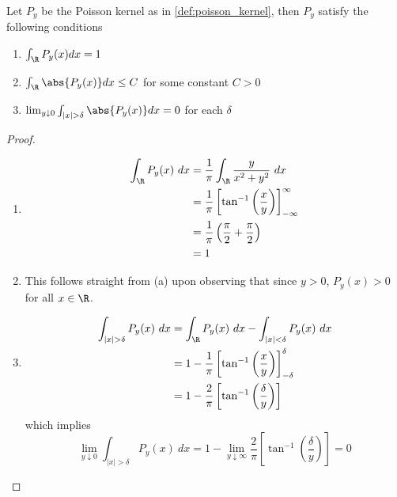 \begin{proposition}
  \label{prop:properties_of_poisson_kernel}
  Let $P_y$ be the Poisson kernel as in \autoref{def:poisson_kernel}, then $P_y$ satisfy the following conditions 
  \begin{enumerate}[label=(\alph*)]
      \item $\int_\R P_y(x)dx = 1$
      \item $\int_\R\abs{P_y(x)}dx \le C$ for some constant $C>0$
      \item $\lim_{y \downarrow 0} \int_{|x| > \delta}\abs{P_y(x)}dx = 0$ for each $\delta$
    \end{enumerate}
\end{proposition}
\begin{proof}
  \begin{enumerate}[label=(\alph*)]
    \item
      \begin{align*}
        \int_\R P_y(x) \ dx &= \frac{1}{\pi}\int_\R \frac{y}{x^2 + y^2} \ dx \\
        &= \frac{1}{\pi}\left[\tan^{-1}\left(\frac{x}{y}\right)\right]_{-\infty}^\infty\\
        &= \frac{1}{\pi}\left(\frac{\pi}{2}+\frac{\pi}{2}\right) \\
        &= 1
    \end{align*}

    \item This follows straight from (a) upon observing that since $y>0$, $P_y(x) > 0$ for all $x \in \R$. 

    \item \begin{align*}
        \int_{|x|>\delta} P_y(x) \ dx & = \int_\R P_y(x) \ dx - \int_{|x| < \delta} P_y(x) \ dx \\
        &= 1 - \frac{1}{\pi}\left[\tan^{-1}\left(\frac{x}{y}\right)\right]_{-\delta}^\delta\\
        &= 1 - \frac{2}{\pi}\left[\tan^{-1}\left(\frac{\delta}{y}\right)\right] \\
    \end{align*}
    which implies \begin{displaymath}
      \lim_{y \downarrow 0} \int_{|x|>\delta} P_y(x) \ dx = 1 - \lim_{y \downarrow \infty}\frac{2}{\pi}\left[\tan^{-1}\left(\frac{\delta}{y}\right)\right] = 0
    \end{displaymath}
  \end{enumerate}
\end{proof}

